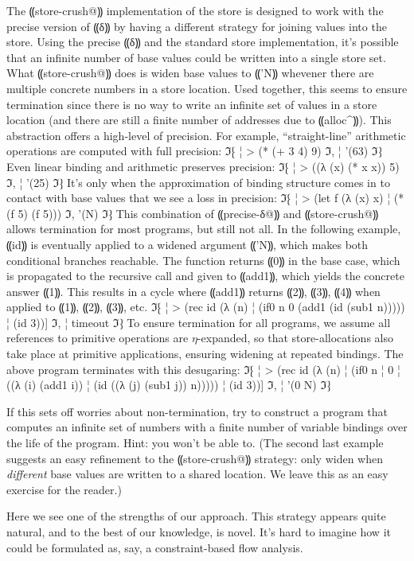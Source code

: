 The ⸨store-crush@⸩ implementation of the store is designed to
work with the precise version of ⸨δ⸩ by having a different
strategy for joining values into the store.  Using the precise
⸨δ⸩ and the standard store implementation, it's possible that
an infinite number of base values could be written into a single store
set.  What ⸨store-crush@⸩ does is widen base values to
⸨'N⸩ whevener there are multiple concrete numbers in a store
location.  Used together, this seems to ensure termination
since there is no way to write an infinite set of values in a
store location (and there are still a finite number of addresses due
to ⸨alloc^⸩).  This abstraction offers a
high-level of precision.  For example, ``straight-line'' arithmetic
operations are computed with full precision:
ℑ⁅
¦ > (* (+ 3 4) 9)
ℑ,
¦ '(63)
ℑ⁆
Even linear binding and arithmetic preserves precision:
ℑ⁅
¦ > ((λ (x) (* x x)) 5)
ℑ,
¦ '(25)
ℑ⁆
It's only when the approximation of binding structure comes in to
contact with base values that we see a loss in precision:
ℑ⁅
¦ > (let f (λ (x) x)
¦     (* (f 5) (f 5)))
ℑ,
'(N)
ℑ⁆
This combination of ⸨precise-δ@⸩ and ⸨store-crush@⸩ allows termination
for most programs, but still not all.
In the following example, ⸨id⸩ is eventually applied to a widened argument ⸨'N⸩,
which makes both conditional branches reachable.
The function returns ⸨0⸩ in the base case,
which is propagated to the recursive call and given to ⸨add1⸩,
which yields the concrete answer ⸨1⸩.
This results in a cycle where ⸨add1⸩ returns ⸨2⸩, ⸨3⸩, ⸨4⸩
when applied to ⸨1⸩, ⸨2⸩, ⸨3⸩, etc.
ℑ⁅
¦ > (rec id (λ (n)
¦             (if0 n 0 (add1 (id (sub1 n)))))
¦     (id 3))]
ℑ,
¦ timeout
ℑ⁆
To ensure termination for all programs, we assume all references
to primitive operations are $η$-expanded, so that store-allocations also take place
at primitive applications, ensuring widening at repeated bindings.
The above program terminates with this desugaring:
ℑ⁅
¦ > (rec id (λ (n)
¦             (if0 n
¦                  0
¦                  ((λ (i) (add1 i))
¦                   (id ((λ (j) (sub1 j)) n)))))
¦     (id 3))]
ℑ,
¦ '(0 N)
ℑ⁆


If this sets off worries about non-termination, try to construct a
program that computes an infinite set of numbers with a finite number
of variable bindings over the life of the program.  Hint: you won't be
able to.  (The second last example suggests an easy refinement to the
⸨store-crush@⸩ strategy: only widen when \emph{different} base
values are written to a shared location.  We leave this as an easy
exercise for the reader.)

Here we see one of the strengths of our approach.  This strategy
appears quite natural, and to the best of our knowledge, is novel.
It's hard to imagine how it could be formulated as, say, a
constraint-based flow analysis.
